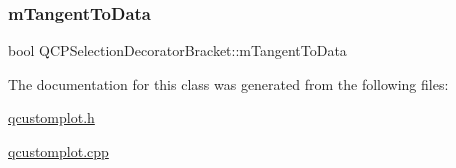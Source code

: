 \mbox{\label{class_q_c_p_selection_decorator_bracket_ac08c7de0fd81b64b0f3fe31739688081}} 
\subsubsection{\texorpdfstring{m\+Tangent\+To\+Data}{mTangentToData}}
{\footnotesize\ttfamily bool Q\+C\+P\+Selection\+Decorator\+Bracket\+::m\+Tangent\+To\+Data\hspace{0.3cm}{\ttfamily [protected]}}



The documentation for this class was generated from the following files\+:\begin{DoxyCompactItemize}
\item 
\hyperlink{qcustomplot_8h}{qcustomplot.\+h}\item 
\hyperlink{qcustomplot_8cpp}{qcustomplot.\+cpp}\end{DoxyCompactItemize}
